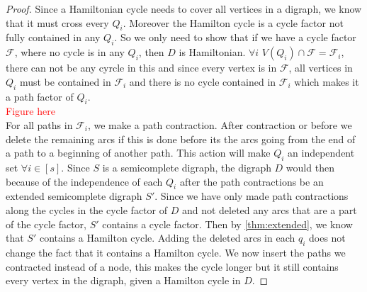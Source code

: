 \begin{proof}
    Since a Hamiltonian cycle needs to cover all vertices in a digraph, we know that it must cross every $Q_i$. 
    Moreover the Hamilton cycle is a cycle factor not fully contained in any $Q_i$. 
    So we only need to show that if we have a cycle factor $\mathcal{F}$, where no cycle is in any $Q_i$, then $D$ is Hamiltonian. $\forall i$ $V(Q_i)\cap \mathcal{F}=\mathcal{F}_i$, there can not be any cyrcle in this and since every vertex is in $\mathcal{F}$, all vertices in $Q_i$ must be contained in $\mathcal{F}_i$ and there is no cycle contained in $\mathcal{F}_i$ which makes it a path factor of $Q_i$.\\
    \textcolor{red}{Figure here}\\
    For all paths in $\mathcal{F}_i$, we make a path contraction. 
    After contraction or before we delete the remaining arcs if this is done before its the arcs going from the end of a path to a beginning of another path. 
    This action will make $Q_i$ an independent set $\forall i\in [s]$. 
    Since $S$ is a semicomplete digraph, the digraph $D$ would then because of the independence of each $Q_i$ after the path contractions be an extended semicomplete digraph $S'$. 
    Since we have only made path contractions along the cycles in the cycle factor of $D$ and not deleted any arcs that are a part of the cycle factor, $S'$ contains a cycle factor. 
    Then by \autoref{thm:extended}, we know that $S'$ contains a Hamilton cycle. 
    Adding the deleted arcs in each $q_i$ does not change the fact that it contains a Hamilton cycle. We now insert the paths we contracted instead of a node, this makes the cycle longer but it still contains every vertex in the digraph, given a Hamilton cycle in $D$.
\end{proof}

